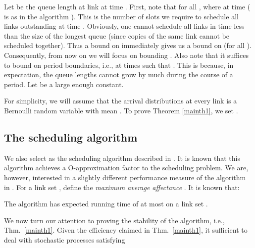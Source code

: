 \documentclass[11pt]{amsart}
\begin{document}
Let  be the queue length at link  at time .
First, note that  for all , where  at time  ( is as in the algorithm ). This is the
number of slots we require  to schedule all links outstanding at time . Obviously, one cannot schedule all links
in time less than the size of the longest queue (since copies of the same link cannot be scheduled together).
Thus a bound on  immediately gives us a bound on  (for all ). Consequently, from now on we will focus on
bounding . Also note that it suffices to bound  on period boundaries, i.e., at times  such that . This is because, in expectation, the queue lengths cannot grow by much during the course of a period.
Let  be a large enough constant.


For simplicity, we will assume that the arrival distributions at every link  is a Bernoulli random variable with mean . 
To prove Theorem \ref{mainth1}, we set . 

\subsection{The scheduling algorithm}
We also select as 
the scheduling algorithm described in \cite{KV10}. It is known \cite{icalp11} that
this algorithm achieves a O-approximation factor to the scheduling problem. We are, however, interested in a slightly different performance measure of the algorithm in \cite{KV10}. For a link set , 
define the \emph{maximum average affectance}
. It is known that:

\begin{theorem}{\cite{KV10}}
  The algorithm  has expected running time of at most  on a link set .
  \label{algeff}
\end{theorem}

We now turn our attention to proving the stability of the algorithm, i.e., Thm.~\ref{mainth1}.
Given the efficiency claimed in Thm.~\ref{mainth1}, it sufficient to deal with stochastic processes satisfying
\end{document}

